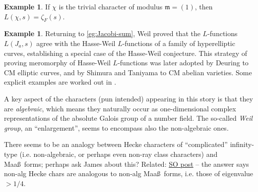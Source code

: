 \documentclass[11pt,a4paper]{article}
\let\mf\mathfrak
\theoremstyle{plain}
\theoremstyle{definition}
\newtheorem{eg}[thm]{Example}
\theoremstyle{remark}
\numberwithin{equation}{section}
\begin{document}
 \begin{eg}
  If $\chi$ is the trivial character of modulus $\mf m = (1)$, then $L(\chi,s) = \zeta_{F}(s)$.
\end{eg}
\begin{eg}
  Returning to \cref{eg:Jacobi-sum}, Weil proved that the
  $L$-functions $L(J_{a},s)$ agree with the Hasse-Weil $L$-functions
  of a family of hyperelliptic curves, establishing a special case of the
  Hasse-Weil conjecture. This strategy of proving meromorphy of
  Hasse-Weil $L$-functions was later adopted by Deuring to
  CM elliptic curves, and by Shimura and Taniyama to CM abelian
  varieties. Some explicit examples are worked out in
  \cite[Ch.18]{ireland1990}.

  A key aspect of the characters (pun intended) appearing in this
  story is that they are \emph{algebraic}, which means they naturally
  occur as one-dimensional complex representations of the absolute
  Galois group of a number field. The 
  so-called \emph{Weil group}, an ``enlargement'', seems to encompass
  also the non-algebraic ones.
\end{eg}

{\color{red} There seems to be an analogy between Hecke characters of
  ``complicated'' infinity-type (i.e. non-algebraic, or perhaps even
  non-ray class characters) and Maa\ss\ forms; perhaps ask James about
this?} {\color{green} Related:
\href{https://mathoverflow.net/questions/221813/non-algebraic-hecke-characters}{SO
post} -- the answer says non-alg Hecke chars are analogous to non-alg
Maa\ss\ forms, i.e. those of eigenvalue $> 1/4$.}
\end{document}
